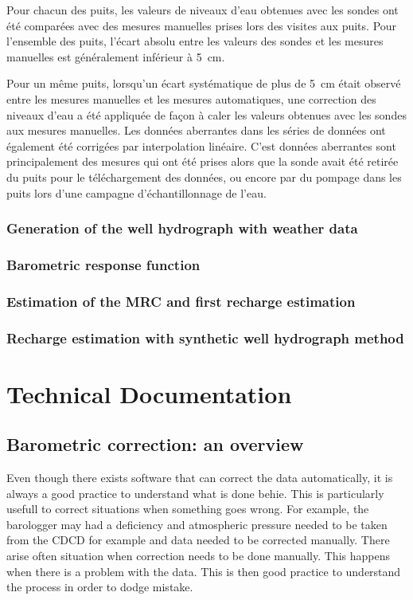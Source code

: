 \documentclass[12pt, letterpaper, fleqn]{report}
\begin{document}
Pour chacun des puits, les valeurs de niveaux d’eau obtenues avec les sondes ont été comparées avec des mesures manuelles prises lors des visites aux puits. Pour l’ensemble des puits, l’écart absolu entre les valeurs des sondes et les mesures manuelles est généralement inférieur à 5 cm.

Pour un même puits, lorsqu'un écart systématique de plus de 5 cm était observé entre les mesures manuelles et les mesures automatiques, une correction des niveaux d’eau a été  appliquée de façon à caler les valeurs obtenues avec les sondes aux mesures manuelles.
Les données aberrantes dans les séries de données ont également été corrigées par interpolation linéaire. C’est données aberrantes sont principalement des mesures qui ont été prises alors que la sonde avait été retirée du puits pour le téléchargement des données, ou encore par du pompage dans les puits lors d’une campagne d’échantillonnage de l’eau.

\subsection{Generation of the well hydrograph with weather data}
\subsection{Barometric response function}
\subsection{Estimation of the MRC and first recharge estimation}
\subsection{Recharge estimation with synthetic well hydrograph method}

\chapter{Technical Documentation}

\section{Barometric correction: an overview}

Even though there exists software that can correct the data automatically, it is always a good practice to understand what is done behie. This is particularly usefull to correct situations when something goes wrong. For example, the barologger may had a deficiency and atmospheric pressure needed to be taken from the CDCD for example and data needed to be corrected manually. There arise often situation when correction needs to be done manually. This happens when there is a problem with the data. This is then good practice to understand the process in order to dodge mistake.
\end{document}
